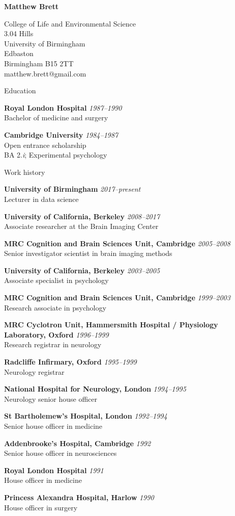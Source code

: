 \documentclass{cv}
\newcommand{\PlaceDate}[2]{{\bf #1} \hfill {\em #2} \\}
\newcommand{\PlaceDateNote}[3]{{\bf #1} \hfill {\em #2} \\#3}
\newcommand{\UoB}{University of Birmingham}
\newcommand{\UCB}{University of California, Berkeley}
\newcommand{\CBU}{MRC Cognition and Brain Sciences Unit, Cambridge}
\begin{document}
\nocite{*}

{\huge \bf Matthew Brett}

College of Life and Environmental Science \\
3.04 Hills \\
University of Birmingham \\
Edbaston \\
Birmingham B15 2TT \\
matthew.brett@gmail.com

\begin{cvSection}{Education}

\PlaceDate{Royal London Hospital}{1987--1990 }
Bachelor of medicine and surgery

\PlaceDateNote{Cambridge University}{1984--1987 }{
Open entrance scholarship \\
BA 2.{\em i}; Experimental psychology}

\end{cvSection}

\begin{cvSection}{Work history}

\PlaceDateNote{\UoB}{2017--present }{
    Lecturer in data science}

\PlaceDateNote{\UCB}{2008--2017 }{
    Associate researcher at the Brain Imaging Center}

\PlaceDateNote{\CBU}{2005--2008}{
    Senior investigator scientist in brain imaging methods}

\PlaceDateNote{\UCB}{2003--2005 }{
    Associate specialist in psychology}

\PlaceDateNote{\CBU}{1999--2003 }{
    Research associate in psychology}

\PlaceDateNote{
MRC Cyclotron Unit, Hammersmith Hospital / Physiology Laboratory, Oxford}
{1996--1999}
{Research registrar in neurology}

\PlaceDateNote{Radcliffe Infirmary, Oxford}
{1995--1999}
{Neurology registrar}

\PlaceDateNote{National Hospital for Neurology, London}{1994--1995 }{
Neurology senior house officer}

\PlaceDateNote{St Bartholemew's Hospital, London}{1992--1994 }{
Senior house officer in medicine}

\PlaceDateNote{Addenbrooke's Hospital, Cambridge}{1992 }{
Senior house officer in neurosciences}

\PlaceDateNote{Royal London Hospital}{1991 }{
House officer in medicine}

\PlaceDateNote{Princess Alexandra Hospital, Harlow}{1990 }{
House officer in surgery}

\end{cvSection}
\end{document}
